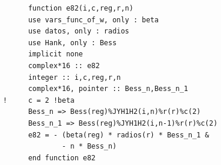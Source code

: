 \documentclass [11pt,spanish]{article}
\begin{document}
\begingroup
\fontsize{10pt}{12pt}
\selectfont
{}
\begin{shaded}
\begin{verbatim}
      function e82(i,c,reg,r,n)
      use vars_func_of_w, only : beta
      use datos, only : radios
      use Hank, only : Bess
      implicit none
      complex*16 :: e82
      integer :: i,c,reg,r,n
      complex*16, pointer :: Bess_n,Bess_n_1
!     c = 2 !beta
      Bess_n => Bess(reg)%JYH1H2(i,n)%r(r)%c(2)
      Bess_n_1 => Bess(reg)%JYH1H2(i,n-1)%r(r)%c(2)
      e82 = - (beta(reg) * radios(r) * Bess_n_1 & 
              - n * Bess_n)
      end function e82
\end{verbatim}
\end{shaded}
\endgroup
\end{document}
